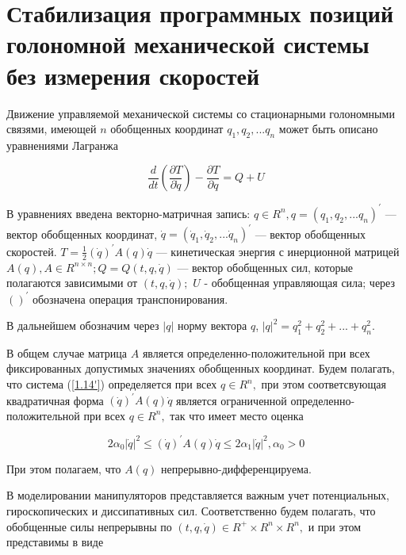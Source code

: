 \section{Стабилизация программных позиций голономной механической системы без измерения скоростей} \label{p12}

Движение управляемой механической системы со стационарными голономными связями, имеющей $n$ обобщенных координат $q_1, q_2, ... q_n$ может быть описано уравнениями Лагранжа 

\begin{equation} \label{1.14'}
\frac{d}{dt} \left( \frac{\partial T}{\partial \dot q} \right) - \frac{\partial T}{\partial q} = Q + U
\end{equation}

 В уравнениях введена векторно-матричная запись: $q \in R^n, q = (q_1, q_2, ... q_n)^{'}$ --- вектор обобщенных координат, $\dot q = (\dot q_1, \dot q_2, ... \dot q_n)^{'}$ --- вектор обобщенных скоростей. $T = \frac{1}{2} (\dot q)^{'} A(q) \dot q$ --- кинетическая энергия с инерционной матрицей $A(q), A \in R^{n \times n};  Q = Q(t, q, \dot q)$ --- вектор обобщенных сил, которые полагаются зависимыми от $(t, q, \dot q);$ $U$ - обобщенная управляющая сила; через $( )^{'}$ обозначена операция транспонирования. 

В дальнейшем обозначим через $\left| q \right|$ норму вектора $q$, $\left| q\right|^{2} = q_1^2 + q_2^2 + ... + q_n^2.$

В общем случае матрица $A$ является определенно-положительной при всех фиксированных допустимых значениях обобщенных координат. Будем полагать, что система (\ref{1.14'}) определяется при всех $q \in R^n,$ при этом соответсвующая квадратичная форма $(\dot q)^{'} A(q) \dot q$ является ограниченной определенно-положительной при всех $q \in R^n,$ так что имеет место оценка 

\begin{equation} \label{1.15'}
2 \alpha_0 \left| \dot q \right|^2 \le (\dot q)^{'} A(q) \dot q \le 2 \alpha_1 \left| \dot q \right|^2, \alpha_0 > 0
\end{equation}

При этом полагаем, что $A(q)$ непрерывно-дифференцируема.

В моделировании манипуляторов представляется важным учет потенциальных, гироскопических и диссипативных сил. Соответственно будем полагать, что обобщенные силы непрерывны по $(t, q, \dot q) \in R^{+} \times R^{n} \times R^{n},$ и при этом представимы в виде

